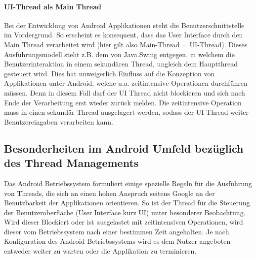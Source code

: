 \documentclass[12pt,oneside,a4paper,bibtotoc,liststotoc]{scrreprt}
\begin{document}
\paragraph{UI-Thread als Main Thread}
Bei der Entwicklung von Android Applikationen steht die Benutzerschnittstelle im Vordergrund. So erscheint es konsequent, dass das User Interface durch den Main Thread verarbeitet wird (hier gilt also Main-Thread = UI-Thread). Dieses Ausführungsmodell steht z.B. dem von Java.Swing entgegen, in welchem die Benutzerinteraktion in einem sekundären Thread, ungleich dem Hauptthread gesteuert wird. Dies hat unweigerlich Einfluss auf die Konzeption von Applikationen unter Android,
 welche u.a. zeitintensive Operationen durchführen müssen. Denn in diesem Fall darf der UI Thread nicht blockieren und sich nach Ende der Verarbeitung erst wieder zurück melden. Die zeitintensive Operation muss in einen sekundär Thread ausgelagert werden, sodass der UI Thread weiter Benutzereingaben verarbeiten kann.

\subsection{Besonderheiten im Android Umfeld bezüglich des Thread Managements}
Das Android Betriebssystem formuliert einige spezielle Regeln für die Ausführung von Threads, die sich an einen hohen Anspruch seitens Google an der Benutzbarkeit der Applikationen orientieren. So ist der Thread für die Steuerung der Benutzeroberfläche (User Interface kurz UI) unter besonderer Beobachtung. Wird dieser Blockiert oder ist ausgelastet mit zeitintensiven Operationen, wird dieser vom Betriebssystem nach einer bestimmen Zeit angehalten. Je nach Konfiguration des Android Betriebssystems wird es dem Nutzer angeboten entweder weiter zu warten oder die Applikation zu terminieren.
\end{document}
